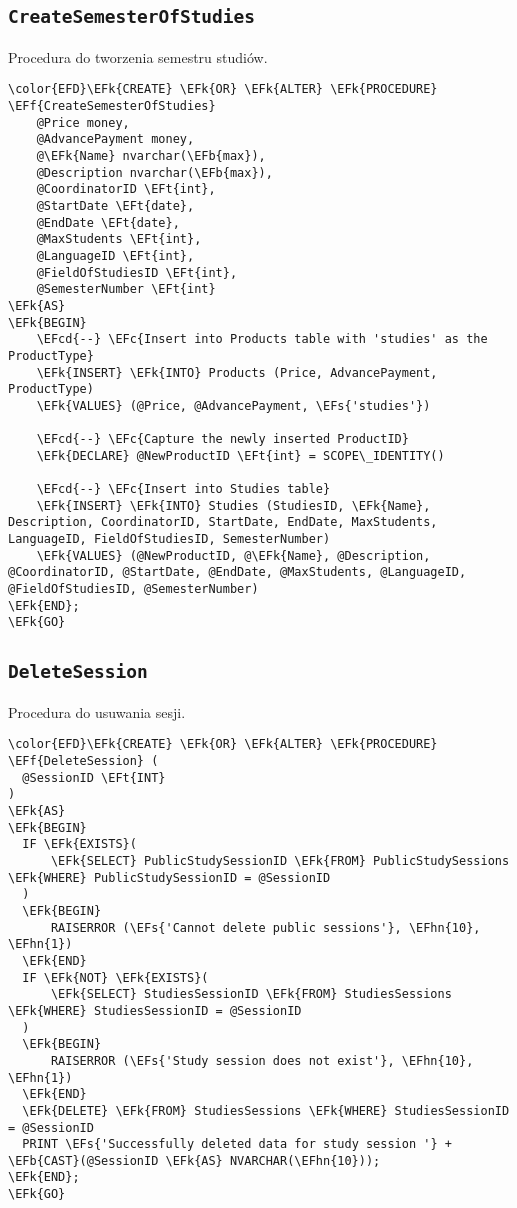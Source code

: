 \documentclass[11pt]{article}
\newcommand{\EFc}[1]{\textcolor{EFc}{\textit{#1}}} %
\newcommand{\EFcd}[1]{\textcolor{EFcd}{\textit{#1}}} %
\newcommand{\EFs}[1]{\textcolor{EFs}{#1}} %
\newcommand{\EFk}[1]{\textcolor{EFk}{\textbf{#1}}} %
\newcommand{\EFb}[1]{\textcolor{EFb}{\textbf{#1}}} %
\newcommand{\EFf}[1]{\textcolor{EFf}{#1}} %
\newcommand{\EFt}[1]{\textcolor{EFt}{\textbf{#1}}} %
\newcommand{\EFhn}[1]{\textcolor{EFhn}{#1}} %
\begin{document}
\subsection{\texttt{CreateSemesterOfStudies}}
\label{sec:org428e6e7}
Procedura do tworzenia semestru studiów.
\begin{Code}
\begin{Verbatim}
\color{EFD}\EFk{CREATE} \EFk{OR} \EFk{ALTER} \EFk{PROCEDURE} \EFf{CreateSemesterOfStudies}
    @Price money,
    @AdvancePayment money,
    @\EFk{Name} nvarchar(\EFb{max}),
    @Description nvarchar(\EFb{max}),
    @CoordinatorID \EFt{int},
    @StartDate \EFt{date},
    @EndDate \EFt{date},
    @MaxStudents \EFt{int},
    @LanguageID \EFt{int},
    @FieldOfStudiesID \EFt{int},
    @SemesterNumber \EFt{int}
\EFk{AS}
\EFk{BEGIN}
    \EFcd{--} \EFc{Insert into Products table with 'studies' as the ProductType}
    \EFk{INSERT} \EFk{INTO} Products (Price, AdvancePayment, ProductType)
    \EFk{VALUES} (@Price, @AdvancePayment, \EFs{'studies'})

    \EFcd{--} \EFc{Capture the newly inserted ProductID}
    \EFk{DECLARE} @NewProductID \EFt{int} = SCOPE\_IDENTITY()

    \EFcd{--} \EFc{Insert into Studies table}
    \EFk{INSERT} \EFk{INTO} Studies (StudiesID, \EFk{Name}, Description, CoordinatorID, StartDate, EndDate, MaxStudents, LanguageID, FieldOfStudiesID, SemesterNumber)
    \EFk{VALUES} (@NewProductID, @\EFk{Name}, @Description, @CoordinatorID, @StartDate, @EndDate, @MaxStudents, @LanguageID, @FieldOfStudiesID, @SemesterNumber)
\EFk{END};
\EFk{GO}
\end{Verbatim}
\end{Code}
\subsection{\texttt{DeleteSession}}
\label{sec:org65f3fb0}
Procedura do usuwania sesji.
\begin{Code}
\begin{Verbatim}
\color{EFD}\EFk{CREATE} \EFk{OR} \EFk{ALTER} \EFk{PROCEDURE} \EFf{DeleteSession} (
  @SessionID \EFt{INT}
)
\EFk{AS}
\EFk{BEGIN}
  IF \EFk{EXISTS}(
      \EFk{SELECT} PublicStudySessionID \EFk{FROM} PublicStudySessions \EFk{WHERE} PublicStudySessionID = @SessionID
  )
  \EFk{BEGIN}
      RAISERROR (\EFs{'Cannot delete public sessions'}, \EFhn{10}, \EFhn{1})
  \EFk{END}
  IF \EFk{NOT} \EFk{EXISTS}(
      \EFk{SELECT} StudiesSessionID \EFk{FROM} StudiesSessions \EFk{WHERE} StudiesSessionID = @SessionID
  )
  \EFk{BEGIN}
      RAISERROR (\EFs{'Study session does not exist'}, \EFhn{10}, \EFhn{1})
  \EFk{END}
  \EFk{DELETE} \EFk{FROM} StudiesSessions \EFk{WHERE} StudiesSessionID = @SessionID
  PRINT \EFs{'Successfully deleted data for study session '} + \EFb{CAST}(@SessionID \EFk{AS} NVARCHAR(\EFhn{10}));
\EFk{END};
\EFk{GO}
\end{Verbatim}
\end{Code}
\end{document}
